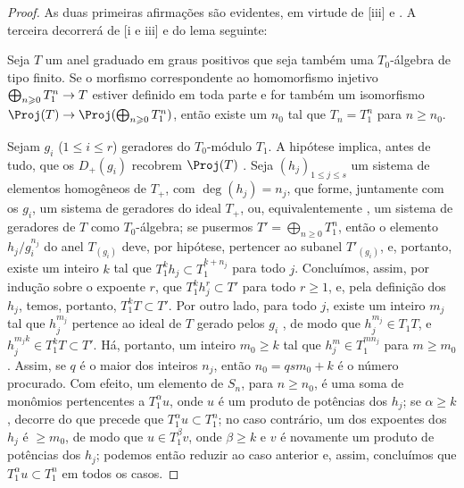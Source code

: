 \documentclass[oneside,10pt]{amsart}
\makeatletter
\renewcommand{\leq}{\leqslant}
\renewcommand{\geq}{\geqslant}
\newcommand{\ega@arrow}[2]{\mathchoice{#1}{#2}{#2}{#2}}
\renewcommand{\to}{\ega@arrow{\longrightarrow}{\rightarrow}}
\newcommand{\oldpage}[2][]{\marginnote{\normalfont\footnotesize\textbf{#1}~|~#2}\ignorespaces}
\let\EGAOriginalLabel\label
\renewcommand{\label}[1]{\phantomsection\EGAOriginalLabel{#1}}
\makeatother
\begin{document}
\begin{proof}
As duas primeiras afirmações são evidentes, em virtude de [iii] e .
A terceira decorrerá de [i e iii] e do lema seguinte:
\begin{lemma}[8.2.14.1]
\label{II.8.2.14.1}
Seja $T$ um anel graduado em graus positivos que seja também uma $T_0$-álgebra de tipo finito.
Se o morfismo correspondente ao homomorfismo injetivo $\bigoplus_{n\geq0}T_1^n\to T$ estiver definido em toda parte e for também um isomorfismo $\Proj(T)\to\Proj(\bigoplus_{n\geq0}T_1^n)$, então existe um $n_0$ tal que $T_n=T_1^n$ para $n\geq n_0$.
\end{lemma}

Sejam $g_i$ ($1\leq i\leq r$) geradores do $T_0$-módulo $T_1$.
A hipótese implica, antes de tudo, que os $D_+(g_i)$ recobrem $\Proj(T)$ .
Seja $(h_j)_{1\leq j\leq s}$ um sistema de elementos homogêneos de $T_+$, com $\deg(h_j)=n_j$, que forme, juntamente com os $g_i$, um sistema de geradores do ideal $T_+$, ou, equivalentemente , um sistema de geradores de $T$ como $T_0$-álgebra;
se pusermos $T'=\bigoplus_{n\geq0}T_1^n$, então o elemento $h_j/g_i^{n_j}$ do anel $T_{(g_i)}$ deve, por hipótese, pertencer ao subanel $T'_{(g_i)}$, e, portanto, existe um inteiro $k$ tal que $T_1^k h_j\subset T_1^{k+n_j}$ para todo $j$.
Concluímos, assim, por indução sobre o expoente $r$, que $T_1^k h_j^r \subset T'$ para todo $r\geq1$, e, pela definição dos $h_j$, temos, portanto, $T_1^k T\subset T'$.
Por outro lado, para todo $j$, existe um inteiro $m_j$ tal que $h_j^{m_j}$ pertence ao ideal de $T$ gerado pelos $g_i$ , de modo que $h_j^{m_j}\in T_1 T$, e
\oldpage[II]{162}
$h_j^{m_j k}\in T_1^k T\subset T'$.
Há, portanto, um inteiro $m_0\geq k$ tal que $h_j^m\in T_1^{m n_j}$ para $m\geq m_0$.
Assim, se $q$ é o maior dos inteiros $n_j$, então $n_0=q s m_0+k$ é o número procurado.
Com efeito, um elemento de $S_n$, para $n\geq n_0$, é uma soma de monômios pertencentes a $T_1^\alpha u$, onde $u$ é um produto de potências dos $h_j$;
se $\alpha\geq k$, decorre do que precede que $T_1^\alpha u\subset T_1^n$;
no caso contrário, um dos expoentes dos $h_j$ é $\geq m_0$, de modo que $u\in T_1^\beta v$, onde $\beta\geq k$ e $v$ é novamente um produto de potências dos $h_j$;
podemos então reduzir ao caso anterior e, assim, concluímos que $T_1^\alpha u\subset T_1^n$ em todos os casos.
\end{proof}
\end{document}
